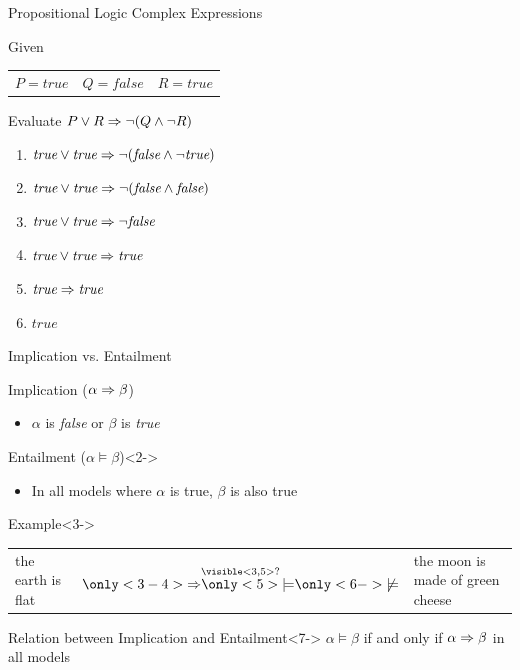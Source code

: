 \documentclass[14pt]{beamer}
\begin{document}
\begin{frame}{Propositional Logic Complex Expressions}
	\begin{block}{Given}
		\begin{tabular}{lll}
			$P=\textit{true}$ & $Q=\textit{false}$ & $R=\textit{true}$ 
		\end{tabular}
	\end{block}
	\begin{block}{Evaluate}
		$P \lor R \Rightarrow \lnot (Q \land \lnot R)$
	\end{block}
	\begin{enumerate}
		\pause\item $\textit{true} \lor \textit{true} \Rightarrow \lnot (\textit{false} \land \lnot \textit{true})$
		\pause\item $\textit{true} \lor \textit{true} \Rightarrow \lnot (\textit{false} \land \textit{false})$
		\pause\item $\textit{true} \lor \textit{true} \Rightarrow \lnot \textit{false}$
		\pause\item $\textit{true} \lor \textit{true} \Rightarrow \textit{true}$
		\pause\item $\textit{true} \Rightarrow \textit{true}$
		\pause\item $\textit{true}$
	\end{enumerate}
\end{frame}

\begin{frame}{Implication vs. Entailment}
\begin{block}{Implication ($\alpha \Rightarrow \beta$)}
\begin{itemize}
\item $\alpha$ is \emph{false} or $\beta$ is \emph{true}
\end{itemize}
\end{block}
\begin{block}{Entailment ($\alpha \models \beta$)}<2->
\begin{itemize}
\item In all models where $\alpha$ is true, $\beta$ is also true
\end{itemize}
\end{block}
\begin{block}{Example}<3->
\setlength{\tabcolsep}{0em}
\begin{tabular}{ l p{2em} l }
the earth is flat &
$\stackrel{\visible<3,5>{?}}{\only<3-4>{\limpl}\only<5>{\models}\only<6->{\not\models}}$ &
the moon is made of green cheese
\end{tabular}
\end{block}
\begin{block}{Relation between Implication and Entailment}<7->
$\alpha \models \beta$ if and only if $\alpha \Rightarrow \beta$ in all models
\end{block}
\end{frame}
\end{document}
